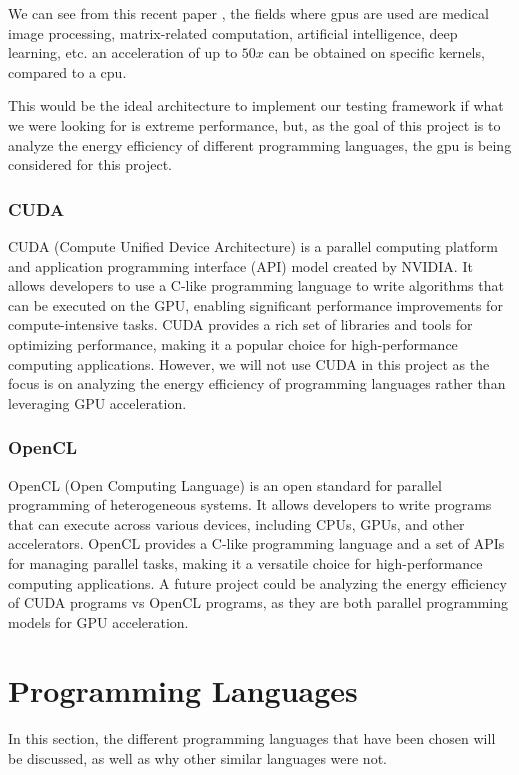 We can see from this recent paper \cite{gpu-energy-efficiency}, the fields where \glspl{gpu} are used are medical image processing, matrix-related computation, artificial intelligence, deep learning, etc. an acceleration of up to $50x$ can be obtained on specific kernels, compared to a \gls{cpu}.

This would be the ideal architecture to implement our testing framework if what we were looking for is extreme performance, but, as the goal of this project is to analyze the energy efficiency of different programming languages, the \gls{gpu} is being considered for this project. 

\subsubsection{CUDA}
\label{sec:cuda}
CUDA (Compute Unified Device Architecture) is a parallel computing platform and application programming interface (API) model created by NVIDIA. It allows developers to use a C-like programming language to write algorithms that can be executed on the GPU, enabling significant performance improvements for compute-intensive tasks. CUDA provides a rich set of libraries and tools for optimizing performance, making it a popular choice for high-performance computing applications. However, we will not use CUDA in this project as the focus is on analyzing the energy efficiency of programming languages rather than leveraging GPU acceleration. 
\subsubsection{OpenCL}
\label{sec:opencl}
OpenCL (Open Computing Language) is an open standard for parallel programming of heterogeneous systems. It allows developers to write programs that can execute across various devices, including CPUs, GPUs, and other accelerators. OpenCL provides a C-like programming language and a set of APIs for managing parallel tasks, making it a versatile choice for high-performance computing applications. A future project could be analyzing the energy efficiency of CUDA programs vs OpenCL programs, as they are both parallel programming models for GPU acceleration.



\section{Programming Languages}

In this section, the different programming languages that have been chosen will be discussed, as well as why other similar languages were not.

